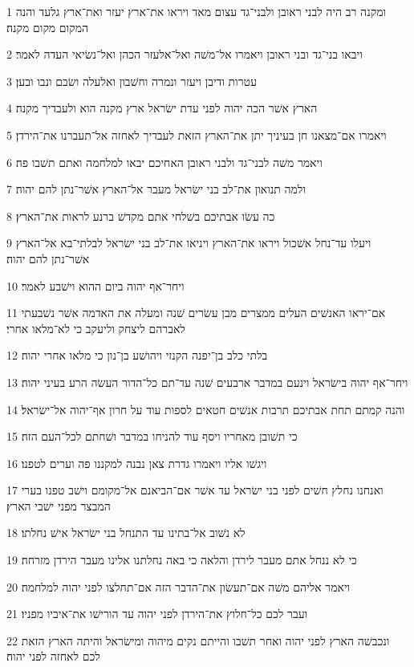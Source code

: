 \par 1 ומקנה רב היה לבני ראובן ולבני־גד עצום מאד ויראו את־ארץ יעזר ואת־ארץ גלעד והנה המקום מקום מקנה׃
\par 2 ויבאו בני־גד ובני ראובן ויאמרו אל־משׁה ואל־אלעזר הכהן ואל־נשׂיאי העדה לאמר׃
\par 3 עטרות ודיבן ויעזר ונמרה וחשׁבון ואלעלה ושׂבם ונבו ובען׃
\par 4 הארץ אשׁר הכה יהוה לפני עדת ישׂראל ארץ מקנה הוא ולעבדיך מקנה׃
\par 5 ויאמרו אם־מצאנו חן בעיניך יתן את־הארץ הזאת לעבדיך לאחזה אל־תעברנו את־הירדן׃
\par 6 ויאמר משׁה לבני־גד ולבני ראובן האחיכם יבאו למלחמה ואתם תשׁבו פה׃
\par 7 ולמה תנואון את־לב בני ישׂראל מעבר אל־הארץ אשׁר־נתן להם יהוה׃
\par 8 כה עשׂו אבתיכם בשׁלחי אתם מקדשׁ ברנע לראות את־הארץ׃
\par 9 ויעלו עד־נחל אשׁכול ויראו את־הארץ ויניאו את־לב בני ישׂראל לבלתי־בא אל־הארץ אשׁר־נתן להם יהוה׃
\par 10 ויחר־אף יהוה ביום ההוא וישׁבע לאמר׃
\par 11 אם־יראו האנשׁים העלים ממצרים מבן עשׂרים שׁנה ומעלה את האדמה אשׁר נשׁבעתי לאברהם ליצחק וליעקב כי לא־מלאו אחרי׃
\par 12 בלתי כלב בן־יפנה הקנזי ויהושׁע בן־נון כי מלאו אחרי יהוה׃
\par 13 ויחר־אף יהוה בישׂראל וינעם במדבר ארבעים שׁנה עד־תם כל־הדור העשׂה הרע בעיני יהוה׃
\par 14 והנה קמתם תחת אבתיכם תרבות אנשׁים חטאים לספות עוד על חרון אף־יהוה אל־ישׂראל׃
\par 15 כי תשׁובן מאחריו ויסף עוד להניחו במדבר ושׁחתם לכל־העם הזה׃
\par 16 ויגשׁו אליו ויאמרו גדרת צאן נבנה למקננו פה וערים לטפנו׃
\par 17 ואנחנו נחלץ חשׁים לפני בני ישׂראל עד אשׁר אם־הביאנם אל־מקומם וישׁב טפנו בערי המבצר מפני ישׁבי הארץ׃
\par 18 לא נשׁוב אל־בתינו עד התנחל בני ישׂראל אישׁ נחלתו׃
\par 19 כי לא ננחל אתם מעבר לירדן והלאה כי באה נחלתנו אלינו מעבר הירדן מזרחה׃
\par 20 ויאמר אליהם משׁה אם־תעשׂון את־הדבר הזה אם־תחלצו לפני יהוה למלחמה׃
\par 21 ועבר לכם כל־חלוץ את־הירדן לפני יהוה עד הורישׁו את־איביו מפניו׃
\par 22 ונכבשׁה הארץ לפני יהוה ואחר תשׁבו והייתם נקים מיהוה ומישׂראל והיתה הארץ הזאת לכם לאחזה לפני יהוה׃
